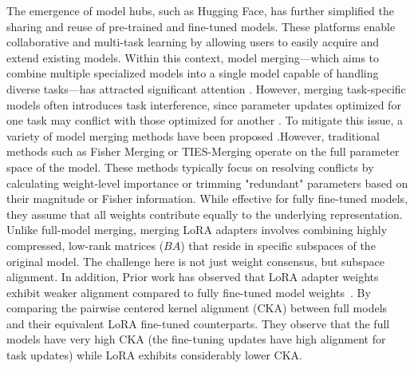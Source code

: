\documentclass[10pt]{article} %
\begin{document}
    The emergence of model hubs, such as Hugging Face, has further simplified the sharing and reuse of pre-trained and fine-tuned models. These platforms enable collaborative and multi-task learning by allowing users to easily acquire and extend existing models. Within this context, model merging—which aims to combine multiple specialized models into a single model capable of handling diverse tasks—has attracted significant attention \citep{wortsman2022model,yadav2023ties,yang2026model,stoica2025model,gargiulo2025task}. However, merging task-specific models often introduces task interference, since parameter updates optimized for one task may conflict with those optimized for another \citep{yadav2023ties}. To mitigate this issue, a variety of model merging methods have been proposed \citep{davari2024model,ilharco2022editing,matena2022merging,wortsman2022model,yadav2023ties,yu2024language,lu2024twin,yang2026model,deep2024della,miyano2025adaptive,chen2025black}.However, traditional methods such as Fisher Merging or TIES-Merging operate on the full parameter space of the model. These methods typically focus on resolving conflicts by calculating weight-level importance or trimming "redundant" parameters based on their magnitude or Fisher information. While effective for fully fine-tuned models, they assume that all weights contribute equally to the underlying representation. Unlike full-model merging, merging LoRA adapters involves combining highly compressed, low-rank matrices ($BA$) that reside in specific subspaces of the original model. The challenge here is not just weight consensus, but subspace alignment. In addition, Prior work has observed that LoRA adapter weights exhibit weaker alignment compared to fully fine-tuned model weights~\citep{stoica2025model}.  By comparing the pairwise centered kernel alignment (CKA) \cite{kornblith2019similarity} between full models and their equivalent LoRA fine-tuned counterparts.  They observe that the full models have very high CKA (the fine-tuning updates have high alignment for task updates) while LoRA exhibits considerably lower CKA.
    
    
    
\end{document}
